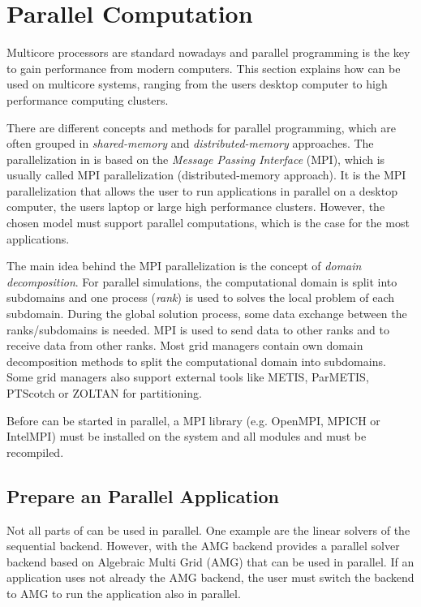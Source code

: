 \section{Parallel Computation}
\label{sec:parallelcomputation}
Multicore processors are standard nowadays and parallel programming is the key to gain
performance from modern computers. This section explains how \Dumux can be used 
on multicore systems, ranging from the users desktop computer to high performance
computing clusters.  

There are different concepts and methods for parallel programming, which are
often grouped in \textit{shared-memory} and \textit{distributed-memory}  
approaches. The parallelization in \Dumux is based on the 
\textit{Message Passing Interface} (MPI), which is usually called MPI parallelization (distributed-memory approach). 
It is the MPI parallelization that allows the user to run
\Dumux applications in parallel on a desktop computer, the users laptop or 
large high performance clusters. However, the chosen \Dumux 
model must support parallel computations, which is the case for the most \Dumux applications.

The main idea behind the MPI parallelization is the concept of \textit{domain 
decomposition}. For parallel simulations, the computational domain is split into 
subdomains and one process (\textit{rank}) is used to solves the local problem of each 
subdomain. During the global solution process, some data exchange between the 
ranks/subdomains is needed. MPI is used to send data to other ranks and to receive 
data from other ranks. 
Most grid managers contain own domain decomposition methods to split the 
computational domain  into subdomains. Some grid managers also support external 
tools like METIS, ParMETIS, PTScotch or ZOLTAN for partitioning.

Before \Dumux can be started in parallel, a 
MPI library (e.g. OpenMPI, MPICH or IntelMPI) 
must be installed on the system and all \Dune modules and \Dumux must be recompiled.  


\subsection{Prepare an Parallel Application}
Not all parts of \Dumux can be used in parallel. One example are the linear solvers
of the sequential backend. However, with the AMG backend \Dumux provides 
a parallel solver backend based on Algebraic Multi Grid (AMG) that can be used in
parallel. 
If an application uses not already the AMG backend, the 
user must switch the backend to AMG to run the application also in parallel.

